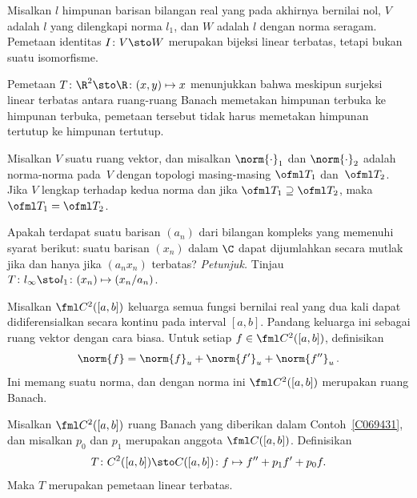 \begin{exam} Misalkan $l$ himpunan barisan bilangan real yang pada akhirnya bernilai nol,
$V$ adalah $l$ yang dilengkapi norma $l_1$, dan $W$ adalah $l$ dengan norma seragam.  Pemetaan
identitas $I\colon V \sto W$ merupakan bijeksi linear terbatas, tetapi bukan suatu isomorfisme.
\end{exam}

\begin{exam} Pemetaan $T\colon \R^2 \sto \R\colon (x,y) \mapsto x$ menunjukkan bahwa meskipun
surjeksi linear terbatas antara ruang-ruang Banach memetakan himpunan terbuka ke himpunan terbuka, pemetaan tersebut tidak harus
memetakan himpunan tertutup ke himpunan tertutup.
\end{exam}

\begin{prop} Misalkan $V$ suatu ruang vektor, dan misalkan $\norm{\cdot}_1$ dan
$\norm{\cdot}_2$ adalah norma-norma pada~$V$ dengan topologi masing-masing $\ofml T_1$
dan~$\ofml T_2$.  Jika $V$ lengkap terhadap kedua norma dan jika $\ofml T_1
\supseteq \ofml T_2$, maka $\ofml T_1 = \ofml T_2$.
\end{prop}

\begin{exer} Apakah terdapat suatu barisan $(a_n)$ dari bilangan kompleks yang memenuhi
syarat berikut: suatu barisan $(x_n)$ dalam $\C$ dapat dijumlahkan secara mutlak jika dan hanya jika
$(a_nx_n)$ terbatas? \emph{Petunjuk.} Tinjau $ T\colon l_\infty \sto l_1\colon (x_n)
\mapsto (x_n/a_n)$.
\end{exer}

\begin{exam}\label{C069431} Misalkan $\fml C^2([a,b])$ keluarga semua fungsi bernilai real yang dua kali
dapat didiferensialkan secara kontinu pada interval $[a,b]$. Pandang keluarga ini sebagai ruang vektor
dengan cara biasa. Untuk setiap $f \in \fml C^2([a,b])$, definisikan
    \[ \norm{f} = \norm{f}_u + \norm{f'}_u + \norm{f''}_u\,. \]
Ini memang suatu norma, dan dengan norma ini $\fml C^2([a,b])$ merupakan ruang Banach.
\end{exam}

\begin{exam}\label{C069432} Misalkan $\fml C^2([a,b])$ ruang Banach yang diberikan dalam
Contoh~\ref{C069431}, dan misalkan $p_0$ dan $p_1$ merupakan anggota $\fml C([a,b])$.   Definisikan
  \[T\colon C^2([a,b]) \sto C([a,b])\colon
                      f \mapsto f'' + p_1f' + p_0f.\]
Maka $T$ merupakan pemetaan linear terbatas.
\end{exam}


